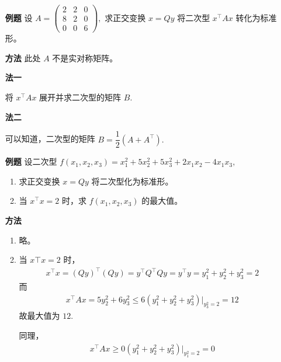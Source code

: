 \begin{enumerate}
    \item[\textbf{例题}] 设 $ A = \begin{pmatrix}
        2&2&0\\8&2&0\\0&0&6
    \end{pmatrix}, $ 求正交变换 $ x = Qy $ 将二次型 $ x^\top Ax $ 转化为标准形。
    \item[\textbf{方法}] 此处 $ A $ 不是实对称矩阵。
    
    \textbf{法一}

    将 $ x^\top Ax $ 展开并求二次型的矩阵 $ B. $ 

    \textbf{法二}

    可以知道，二次型的矩阵 $ B = \dfrac{1}{2}(A+A^\top). $ 
\end{enumerate}

\begin{enumerate}
    \item[\textbf{例题}] 设二次型 $ f(x_1,x_2,x_3) = x_1^2 + 5x_2^2 + 5x_3^2 +2x_1x_2 - 4x_1x_3, $ 
    \begin{enumerate}
        \item 求正交变换 $ x = Qy $ 将二次型化为标准形。
        \item 当 $ x^\top x = 2 $ 时，求 $ f(x_1,x_2,x_3) $ 的最大值。
    \end{enumerate}
    \item[\textbf{方法}] 
    \begin{enumerate}
        \item 略。
        \item 当 $ x\top x = 2 $ 时，
        \begin{equation*}
            \begin{aligned}
                x^\top x = (Qy)^\top (Qy) = y^\top Q^\top Q y = y^\top y = 
                y_1^2 + y_2^2 + y_3^2 = 2
            \end{aligned}
        \end{equation*}
        而
        \begin{equation*}
            \begin{aligned}
                x^\top Ax = 5y_2^2 + 6y_3^2 \leq
                6(y_1^2+y_2^2+y_3^2)|_{y_3^2 = 2} = 12
            \end{aligned}
        \end{equation*}
        故最大值为 $ 12. $ 
        
        同理，
        \begin{equation*}
            \begin{aligned}
                x^\top Ax \geq 0(y_1^2+y_2^2+y_3^2)|_{y_1^2 = 2} = 0
            \end{aligned}
        \end{equation*}
    \end{enumerate}
\end{enumerate}

